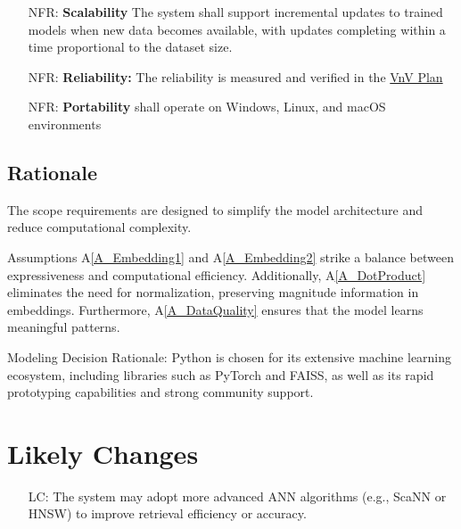 \documentclass[12pt]{article}
\newcommand{\aref}[1]{A\ref{#1}}
\newcounter{nfrnum} %
\newcounter{lcnum} %
\begin{document}
\noindent \begin{itemize}

\item[NFR\refstepcounter{nfrnum}\thenfrnum \label{NFR_Scalability}:]
  \textbf{Scalability} The system shall support incremental updates to trained models when new data becomes available, with updates completing within a time proportional to the dataset size.

\item[NFR\refstepcounter{nfrnum}\thenfrnum \label{NFR_Reliability:}:]
  \textbf{Reliability:} The reliability is measured and verified in the \href{https://github.com/V-AS/Two-tower-recommender-system/blob/main/docs/VnVPlan/VnVPlan.pdf}{VnV Plan}

\item[NFR\refstepcounter{nfrnum}\thenfrnum \label{NFR_Portability}:]
  \textbf{Portability} \progname{} shall operate on Windows, Linux, and macOS environments

\end{itemize}

\subsection{Rationale}

The scope requirements are designed to simplify the model architecture and reduce computational complexity.

Assumptions \aref{A_Embedding1} and \aref{A_Embedding2} strike a balance between expressiveness and computational efficiency. Additionally, \aref{A_DotProduct} eliminates the need for normalization, preserving magnitude information in embeddings. Furthermore, \aref{A_DataQuality} ensures that the model learns meaningful patterns.

Modeling Decision Rationale: 
Python is chosen for its extensive machine learning ecosystem, including libraries such as PyTorch and FAISS, as well as its rapid prototyping capabilities and strong community support.

\section{Likely Changes}    

\noindent \begin{itemize}

\item[LC\refstepcounter{lcnum}\thelcnum\label{LC_advancedANN}:] The system may adopt more advanced ANN algorithms (e.g., ScaNN or HNSW) to improve retrieval efficiency or accuracy.

\end{itemize}
\end{document}
